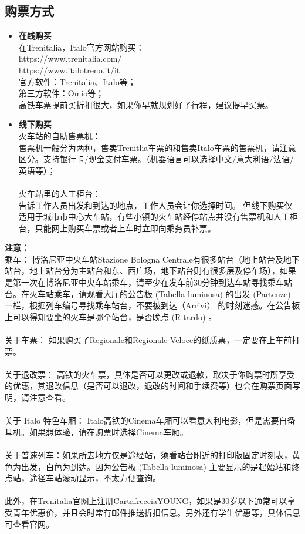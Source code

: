 \subsection{购票方式}
\begin{itemize}
\item  \textbf{在线购买}\\
在Trenitalia，Italo官方网站购买：\\
https://www.trenitalia.com/\\
https://www.italotreno.it/it\\
官方软件：Trenitalia、Italo等；\\
第三方软件：Omio等；\\
高铁车票提前买折扣很大，如果你早就规划好了行程，建议提早买票。\\
\item  \textbf{线下购买}\\
火车站的自助售票机：\\
售票机一般分为两种，售卖Trenitlia车票的和售卖Italo车票的售票机，请注意区分。支持银行卡/现金支付车票。（机器语言可以选择中文/意大利语/法语/英语等）；\\
\\
火车站里的人工柜台：\\
告诉工作人员出发和到达的地点，工作人员会让你选择时间。
但线下购买仅适用于城市市中心大车站，有些小镇的火车站经停站点并没有售票机和人工柜台，只能网上购买车票或者上车时立即向乘务员补票。
\end{itemize}
\textbf{注意：}\\
乘车：
博洛尼亚中央车站Stazione Bologna Centrale有很多站台（地上站台及地下站台，地上站台分为主站台和东、西广场，地下站台则有很多层及停车场），如果是第一次在博洛尼亚中央车站乘车，请至少在发车前30分钟到达车站寻找乘车站台。在火车站乘车，请观看大厅的公告板 (Tabella luminosa) 的出发 (Partenze) 一栏，根据列车编号寻找乘车站台，不要被到达（Arrivi） 的时刻迷惑。在公告板上可以得知要坐的火车是哪个站台，是否晚点 (Ritardo) 。\\
\\
关于车票：
如果购买了Regionale和Regionale Veloce的纸质票，一定要在上车前打票。\\
\\
关于退改票：
高铁的火车票，具体是否可以更改或退款，取决于你购票时所享受的优惠，其退改信息（是否可以退改，退改的时间和手续费等）也会在购票页面写明，请注意查看。\\
\\
关于 Italo 特色车厢：
Italo高铁的Cinema车厢可以看意大利电影，但是需要自备耳机。如果想体验，请在购票时选择Cinema车厢。\\
\\
关于普速列车：如果所去地方仅是途经站，须看站台附近的打印版固定时刻表，黄色为出发，白色为到达。因为公告板 (Tabella luminosa) 主要显示的是起始站和终点站，途径车站滚动显示，不太方便查询。 \\
\\
此外，在Trenitalia官网上注册CartafrecciaYOUNG，如果是30岁以下通常可以享受青年优惠价，并且会时常有邮件推送折扣信息。另外还有学生优惠等，具体信息可查看官网。\\


